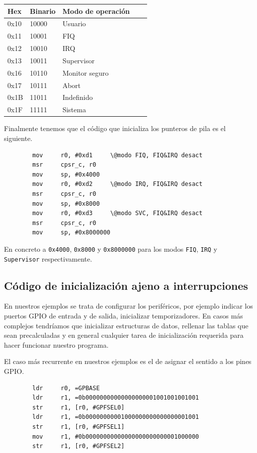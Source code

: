 \begin{longtable}{ p{1.8cm} | p{2cm} | p{5cm} | p{1cm} | p{1cm} }
\hline
{\bf Hex} & {\bf Binario} & {\bf Modo de operación} \\ \hline
0x10 & 10000 & Usuario        \\ \hline
0x11 & 10001 & FIQ            \\ \hline
0x12 & 10010 & IRQ            \\ \hline
0x13 & 10011 & Supervisor     \\ \hline
0x16 & 10110 & Monitor seguro \\ \hline
0x17 & 10111 & Abort          \\ \hline
0x1B & 11011 & Indefinido     \\ \hline
0x1F & 11111 & Sistema        \\ \hline
\end{longtable}

Finalmente tenemos que el código que inicializa los punteros de pila es el siguiente.

\begin{lstlisting}
        mov     r0, #0xd1     \@modo FIQ, FIQ&IRQ desact
        msr     cpsr_c, r0
        mov     sp, #0x4000
        mov     r0, #0xd2     \@modo IRQ, FIQ&IRQ desact
        msr     cpsr_c, r0
        mov     sp, #0x8000
        mov     r0, #0xd3     \@modo SVC, FIQ&IRQ desact
        msr     cpsr_c, r0
        mov     sp, #0x8000000
\end{lstlisting}

En concreto a {\tt 0x4000}, {\tt 0x8000} y {\tt 0x8000000} para los modos {\tt FIQ}, {\tt IRQ} y
{\tt Supervisor} respectivamente.

\subsection{Código de inicialización ajeno a interrupciones}

En nuestros ejemplos se trata de configurar los periféricos, por ejemplo indicar los puertos
GPIO de entrada y de salida, inicializar temporizadores. En casos más complejos tendríamos que
inicializar estructuras de datos, rellenar las tablas que sean precalculadas y en general
cualquier tarea de inicialización requerida para hacer funcionar nuestro programa.

El caso más recurrente en nuestros ejemplos es el de asignar el sentido a los pines GPIO.

\begin{lstlisting}
        ldr     r0, =GPBASE
        ldr     r1, =0b00000000000000000001001001001001
        str     r1, [r0, #GPFSEL0]
        ldr     r1, =0b00000000001000000000000000001001
        str     r1, [r0, #GPFSEL1]
        mov     r1, #0b00000000000000000000000001000000
        str     r1, [r0, #GPFSEL2]
\end{lstlisting}

